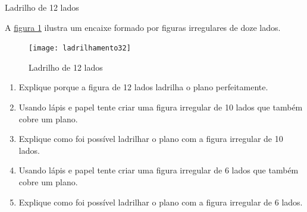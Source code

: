 \begin{task}{Ladrilho de 12 lados}

A \hyperref[12lados]{figura \ref{12lados}} ilustra um encaixe formado por figuras irregulares de doze lados. 

	\begin{figure}[H]
	\centering
	\texttt{[image: ladrilhamento32]}
	\caption{Ladrilho de 12 lados}
	\label{12lados}
	\end{figure}
	
	\begin{enumerate}
		\item Explique porque a figura de 12 lados ladrilha o plano perfeitamente.
		\item Usando lápis e papel tente criar uma figura irregular de 10 lados que também cobre um plano.
		\item Explique como foi possível ladrilhar o plano com a figura irregular de 10 lados.
		\item Usando lápis e papel tente criar uma figura irregular de 6 lados que também cobre um plano.
		\item Explique como foi possível ladrilhar o plano com a figura irregular de 6 lados.
	\end{enumerate}
	
\end{task}






\exercise

